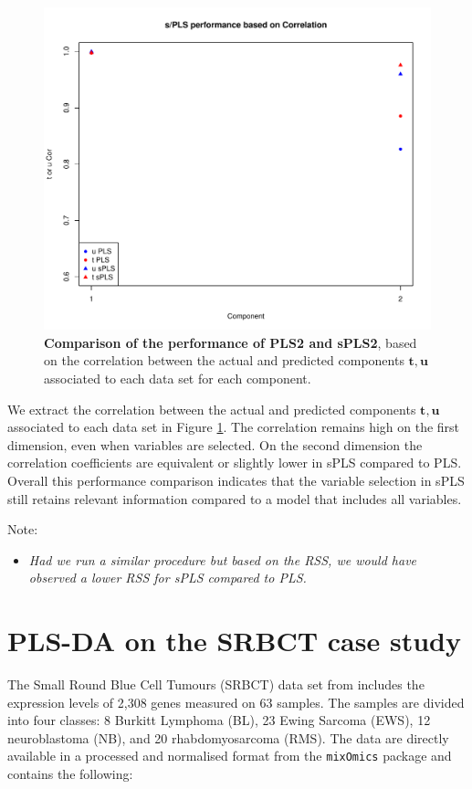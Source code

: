\documentclass[
]{book}
\providecommand{\tightlist}{%
  \setlength{\itemsep}{0pt}\setlength{\parskip}{0pt}}
\begin{document}
\begin{figure}

{\centering \includegraphics[width=0.7\linewidth]{Figures/PLS/04-spls2-perf2-1} 

}

\caption{\textbf{Comparison of the performance of PLS2 and sPLS2}, based on the correlation between the actual and predicted components \(\boldsymbol{t,u}\) associated to each data set for each component.}\label{fig:04-spls2-perf2}
\end{figure}



We extract the correlation between the actual and predicted components \(\boldsymbol{t,u}\) associated to each data set in Figure \ref{fig:04-spls2-perf2}. The correlation remains high on the first dimension, even when variables are selected. On the second dimension the correlation coefficients are equivalent or slightly lower in sPLS compared to PLS. Overall this performance comparison indicates that the variable selection in sPLS still retains relevant information compared to a model that includes all variables.

Note:

\begin{itemize}
\tightlist
\item
  \emph{Had we run a similar procedure but based on the RSS, we would have observed a lower RSS for sPLS compared to PLS.}
\end{itemize}

\hypertarget{plsda}{%
\chapter{PLS-DA on the SRBCT case study}\label{plsda}}

The Small Round Blue Cell Tumours (SRBCT) data set from \citep{Kha01} includes the expression levels of 2,308 genes measured on 63 samples. The samples are divided into four classes: 8 Burkitt Lymphoma (BL), 23 Ewing Sarcoma (EWS), 12 neuroblastoma (NB), and 20 rhabdomyosarcoma (RMS). The data are directly available in a processed and normalised format from the \texttt{mixOmics} package and contains the following:
\end{document}
